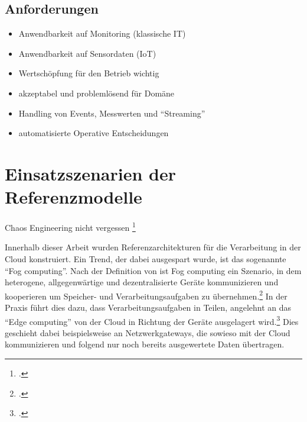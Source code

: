 \subsection{Anforderungen}
\begin{itemize}
\item Anwendbarkeit auf Monitoring (klassische IT)
\item Anwendbarkeit auf Sensordaten (\ac{IoT})
\item Wertschöpfung für den Betrieb wichtig
\item akzeptabel und problemlösend für Domäne
\item Handling von Events, Messwerten und \enquote{Streaming}
\item automatisierte Operative Entscheidungen
\end{itemize}

\section{Einsatzszenarien der Referenzmodelle}


Chaos Engineering nicht vergessen \footcite[Vgl.][]{Augsten.2020}

Innerhalb dieser Arbeit wurden Referenzarchitekturen für die Verarbeitung in der Cloud konstruiert. Ein Trend, der dabei ausgespart wurde, ist das sogenannte \enquote{Fog computing}. Nach der Definition von \citeauthor{Vaquero.2014} ist Fog computing ein Szenario, in dem heterogene, allgegenwärtige und dezentralisierte Geräte kommunizieren und kooperieren um Speicher- und Verarbeitungsaufgaben zu übernehmen.\footcite[Vgl.][30\psq]{Vaquero.2014} In der Praxis führt dies dazu, dass Verarbeitungsaufgaben in Teilen, angelehnt an das \enquote{Edge computing} von der Cloud in Richtung der Geräte ausgelagert wird.\footcite[Vgl.][]{Bonomi.2012} Dies geschieht dabei beispielsweise an Netzwerkgateways, die sowieso mit der Cloud kommunizieren und folgend nur noch bereits ausgewertete Daten übertragen.